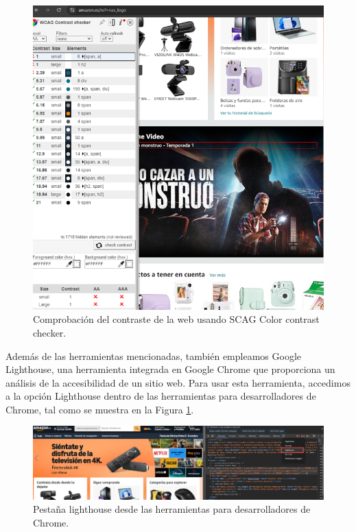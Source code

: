 \documentclass[letterpaper, 12pt]{report}
\begin{document}
\begin{figure}[H]
\centering
\includegraphics[width=1\textwidth]{figure19.png}
\caption{Comprobación del contraste de la web usando SCAG Color contrast checker.}
\label{fig:19}
\end{figure}

Además de las herramientas mencionadas, también empleamos Google Lighthouse, una herramienta integrada en Google Chrome que proporciona un análisis de la accesibilidad de un sitio web. Para usar esta herramienta, accedimos a la opción Lighthouse dentro de las herramientas para desarrolladores de Chrome, tal como se muestra en la Figura \ref{fig:19}.

\begin{figure}[H]
\centering
\includegraphics[width=1\textwidth]{figure20.png}
\caption{Pestaña lighthouse desde las herramientas para desarrolladores de Chrome.}
\label{fig:20}
\end{figure}
\end{document}
